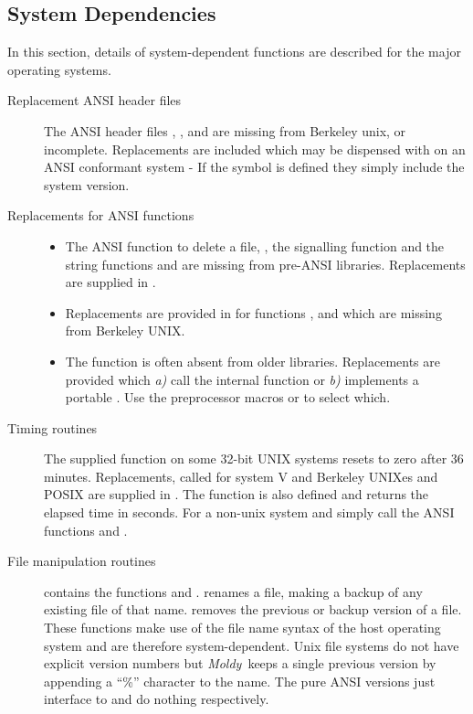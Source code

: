 \documentclass[a4paper,twoside]{report}
\newcommand{\moldy}{\emph{Moldy}}
\begin{document}
\subsection{System Dependencies}
In this section, details of system-dependent functions are described
for the major operating systems.
  \begin{description}
\item[Replacement ANSI header files]
 \begin{sloppypar}
   The ANSI header files , ,
    and  are missing from Berkeley
   unix, or incomplete.  Replacements are included which may be
   dispensed with on an ANSI conformant system - If the symbol
    is defined they simply include the system
   version.
 \end{sloppypar}

\item[Replacements for ANSI functions] \hspace*{1em}
\noindent 
  \begin{itemize}
  \item The ANSI function to delete a file, , the
    signalling function  and the string functions
     and  are missing from
    pre-ANSI libraries.  Replacements are supplied in .
  \item Replacements are provided in  for functions
    ,  and  which
    are missing from Berkeley UNIX.
  \item The function  is often absent from older
    libraries. Replacements are provided which \emph{a)} call the
    internal function  or \emph{b)} implements a
    portable .  Use the preprocessor macros
     or  to select which.
  \end{itemize}
\item[Timing routines] The supplied  function on some
  32-bit UNIX systems resets to zero after 36 minutes.  Replacements,
  called  for system V and Berkeley UNIXes and POSIX are
  supplied in .  The function  is also
  defined and returns the elapsed time in seconds.  For a non-unix
  system  and  simply call the ANSI
  functions  and .
\item[File manipulation routines]
  contains the functions  and
  .   renames a file, making a
  backup of any existing file of that name.  removes
  the previous or backup version of a file.  These functions make use
  of the file name syntax of the host operating system and are
  therefore system-dependent.  Unix file systems do not have explicit
  version numbers but \moldy\ keeps a single previous version by
  appending a ``\%'' character to the name.  The pure ANSI versions
  just interface to  and do nothing respectively.
\end{description}
\end{document}
